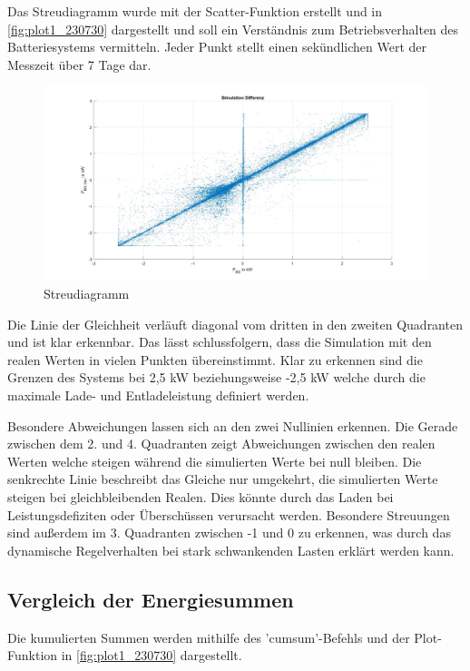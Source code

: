 Das Streudiagramm wurde mit der Scatter-Funktion erstellt und in \autoref{fig:plot1_230730} dargestellt und soll ein Verständnis zum Betriebsverhalten des Batteriesystems vermitteln. Jeder Punkt stellt einen sekündlichen Wert der Messzeit über 7 Tage dar.
\begin{figure}[H]
    \centering
    \includegraphics[width=\textwidth]{Abbildungen/streudiagramm.jpg}
    \caption{Streudiagramm}
    \label{fig:plot1_230730}
\end{figure}

Die Linie der Gleichheit verläuft diagonal vom dritten in den zweiten Quadranten und ist klar erkennbar. Das lässt schlussfolgern, dass die Simulation mit den realen Werten in vielen Punkten übereinstimmt.
Klar zu erkennen sind die Grenzen des Systems bei 2,5 kW beziehungsweise -2,5 kW welche durch die maximale Lade- und Entladeleistung definiert werden.

Besondere Abweichungen lassen sich an den zwei Nullinien erkennen. Die Gerade zwischen dem 2. und 4. Quadranten zeigt Abweichungen zwischen den realen Werten welche steigen während die simulierten Werte bei null bleiben. Die senkrechte Linie beschreibt das Gleiche nur umgekehrt, die simulierten Werte steigen bei gleichbleibenden Realen.
Dies könnte durch das Laden bei Leistungsdefiziten oder Überschüssen verursacht werden.
Besondere Streuungen sind außerdem im 3. Quadranten zwischen -1 und 0 zu erkennen, was durch das dynamische Regelverhalten bei stark schwankenden Lasten erklärt werden kann. 

\subsection{Vergleich der Energiesummen}
Die kumulierten Summen werden mithilfe des 'cumsum'-Befehls und der Plot-Funktion in \autoref{fig:plot1_230730} dargestellt.

